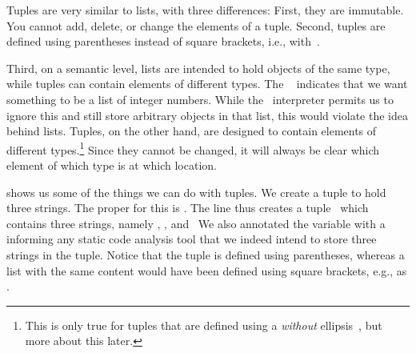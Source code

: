 %
\label{sec:tuples}%
%
%
%
%
%
%
%
%
Tuples are very similar to lists, with three differences:
First, they are immutable.
You cannot add, delete, or change the elements of a tuple.
Second, tuples are defined using parentheses instead of square brackets, i.e., with~\pythonIdx{(\idxdots)}.

Third, on a semantic level, lists are intended to hold objects of the same type, while tuples can contain elements of different types.
The ~ indicates that we want something to be a list of integer numbers.
While the \python\ interpreter permits us to ignore this and still store arbitrary objects in that list, this would violate the idea behind lists.
Tuples, on the other hand, are designed to contain elements of different types.\footnote{%
This is only true for tuples that are defined using a  \emph{without} ellipsis~\pythonIdx{\idxdots}, but more about this later.%
}
Since they cannot be changed, it will always be clear which element of which type is at which location.
%
%
%
%
%
\begin{sloppypar}%
 shows us some of the things we can do with tuples.
We create a tuple  to hold three strings.
The proper  for this is .
The line  thus creates a tuple~ which contains three strings, namely , , and~
We also annotated the variable with a  informing any static code analysis tool that we indeed intend to store three strings in the tuple.
Notice that the tuple is defined using parentheses, whereas a list with the same content would have been defined using square brackets, e.g., as .%
\end{sloppypar}%
